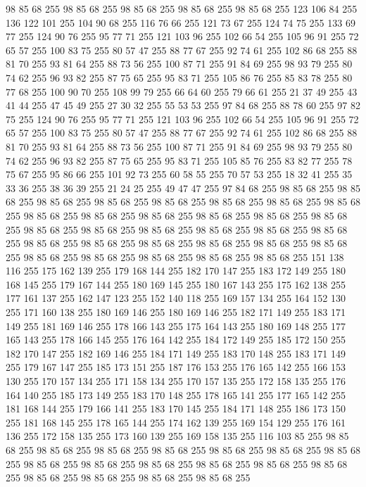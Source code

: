 98 85 68 255 98 85 68 255 98 85 68 255 98 85 68 255 98 85 68 255 123 106 84 255 136 122 101 255 104 90 68 255 116 76 66 255 121 73 67 255 124 74 75 255 133 69 77 255 124 90 76 255 95 77 71 255 121 103 96 255 102 66 54 255 105 96 91 255 72 65 57 255 100 83 75 255 80 57 47 255 88 77 67 255 92 74 61 255 102 86 68 255 88 81 70 255 93 81 64 255 88 73 56 255 100 87 71 255 91 84 69 255 98 93 79 255 80 74 62 255 96 93 82 255 87 75 65 255 95 83 71 255 105 86 76 255 85 83 78 255 80 77 68 255 100 90 70 255 108 99 79 255 66 64 60 255 79 66 61 255 21 37 49 255 43 41 44 255 47 45 49 255 27 30 32 255 55 53 53 255 97 84 68 255 88 78 60 255 97 82 75 255 124 90 76 255 95 77 71 255 121 103 96 255 102 66 54 255 105 96 91 255 72 65 57 255 100 83 75 255 80 57 47 255 88 77 67 255 92 74 61 255 102 86 68 255 88 81 70 255 93 81 64 255 88 73 56 255 100 87 71 255 91 84 69 255
98 93 79 255 80 74 62 255 96 93 82 255 87 75 65 255 95 83 71 255 105 85 76 255 83 82 77 255 78 75 67 255 95 86 66 255 101 92 73 255 60 58 55 255 70 57 53 255 18 32 41 255 35 33 36 255 38 36 39 255 21 24 25 255 49 47 47 255 97 84 68 255 98 85 68 255 98 85 68 255 98 85 68 255 98 85 68 255 98 85 68 255 98 85 68 255 98 85 68 255 98 85 68 255 98 85 68 255 98 85 68 255 98 85 68 255 98 85 68 255 98 85 68 255 98 85 68 255 98 85 68 255 98 85 68 255 98 85 68 255 98 85 68 255 98 85 68 255 98 85 68 255 98 85 68 255 98 85 68 255 98 85 68 255 98 85 68 255 98 85 68 255 98 85 68 255 98 85 68 255 98 85 68 255 98 85 68 255 98 85 68 255 98 85 68 255 151 138 116 255 175 162 139 255 179 168 144 255 182 170 147 255 183 172 149 255 180 168 145 255 179 167 144 255 180 169 145 255 180 167 143 255 175 162 138 255 177 161 137 255 162 147 123 255 152 140 118 255 169 157 134 255 164 152 130 255
171 160 138 255 180 169 146 255 180 169 146 255 182 171 149 255 183 171 149 255 181 169 146 255 178 166 143 255 175 164 143 255 180 169 148 255 177 165 143 255 178 166 145 255 176 164 142 255 184 172 149 255 185 172 150 255 182 170 147 255 182 169 146 255 184 171 149 255 183 170 148 255 183 171 149 255 179 167 147 255 185 173 151 255 187 176 153 255 176 165 142 255 166 153 130 255 170 157 134 255 171 158 134 255 170 157 135 255 172 158 135 255 176 164 140 255 185 173 149 255 183 170 148 255 178 165 141 255 177 165 142 255 181 168 144 255 179 166 141 255 183 170 145 255 184 171 148 255 186 173 150 255 181 168 145 255 178 165 144 255 174 162 139 255 169 154 129 255 176 161 136 255 172 158 135 255 173 160 139 255 169 158 135 255 116 103 85 255 98 85 68 255 98 85 68 255 98 85 68 255 98 85 68 255 98 85 68 255 98 85 68 255 98 85 68 255 98 85 68 255 98 85 68 255 98 85 68 255 98 85 68 255 98 85 68 255 98 85 68 255 98 85 68 255 98 85 68 255 98 85 68 255 98 85 68 255
